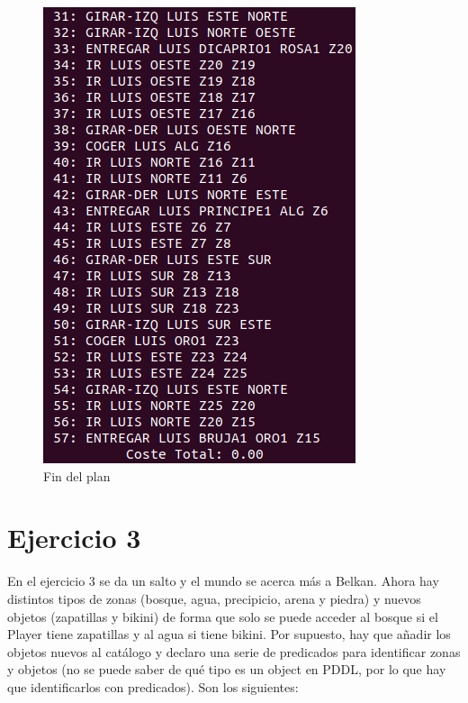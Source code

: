 \begin{figure}[H]
\begin{minipage}[b]{0.5\linewidth}
		\includegraphics[width=\linewidth]{ej2-2.png}
		\caption{Fin del plan}
		\label{fig:ej2-2}
	\end{minipage}
\end{figure}

\section{Ejercicio 3}

En el ejercicio 3 se da un salto y el mundo se acerca más a Belkan. Ahora hay distintos tipos de zonas (bosque, agua, precipicio, arena y piedra) y nuevos objetos (zapatillas y bikini) de forma que solo se puede acceder al bosque si el Player tiene zapatillas y al agua si tiene bikini. Por supuesto, hay que añadir los objetos nuevos al catálogo y declaro una serie de predicados para identificar zonas y objetos (no se puede saber de qué tipo es un object en PDDL, por lo que hay que identificarlos con predicados). Son los siguientes:

